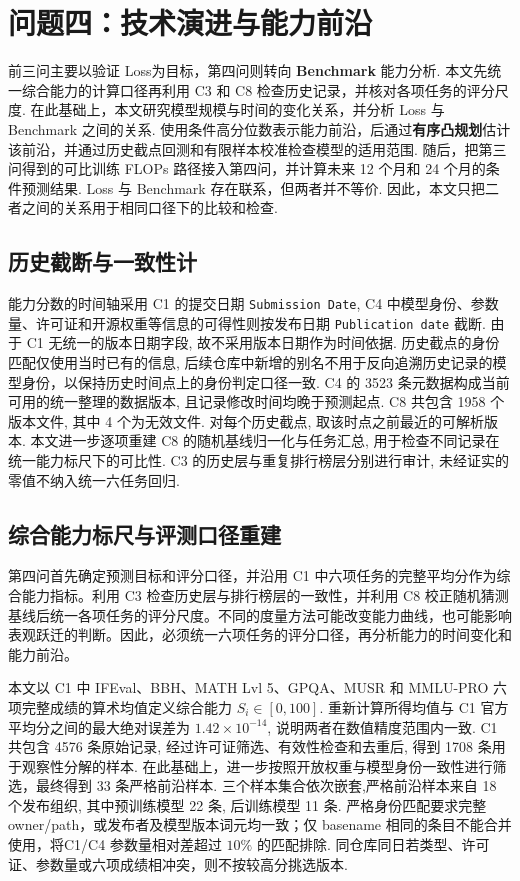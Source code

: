 \section{问题四：技术演进与能力前沿}\label{sec:q4}


前三问主要以验证 Loss为目标，第四问则转向 \textbf{Benchmark} 能力分析. 本文先统一综合能力的计算口径再利用 C3 和 C8 检查历史记录，并核对各项任务的评分尺度. 在此基础上，本文研究模型规模与时间的变化关系，并分析 Loss 与 Benchmark 之间的关系. 使用条件高分位数表示能力前沿，后通过\textbf{有序凸规划}估计该前沿，并通过历史截点回测和有限样本校准检查模型的适用范围. 随后，把第三问得到的可比训练 FLOPs 路径接入第四问，并计算未来 12 个月和 24 个月的条件预测结果. Loss 与 Benchmark 存在联系，但两者并不等价. 因此，本文只把二者之间的关系用于相同口径下的比较和检查.

\subsection{历史截断与一致性计}
能力分数的时间轴采用 C1 的提交日期 \texttt{Submission Date}, C4 中模型身份、参数量、许可证和开源权重等信息的可得性则按发布日期 \texttt{Publication date} 截断. 由于 C1 无统一的版本日期字段, 故不采用版本日期作为时间依据. 历史截点的身份匹配仅使用当时已有的信息, 后续仓库中新增的别名不用于反向追溯历史记录的模型身份，以保持历史时间点上的身份判定口径一致. C4 的 3523 条元数据构成当前可用的统一整理的数据版本, 且记录修改时间均晚于预测起点. C8 共包含 1958 个版本文件, 其中 4 个为无效文件. 对每个历史截点, 取该时点之前最近的可解析版本. 本文进一步逐项重建 C8 的随机基线归一化与任务汇总, 用于检查不同记录在统一能力标尺下的可比性. C3 的历史层与重复排行榜层分别进行审计, 未经证实的零值不纳入统一六任务回归.

\subsection{综合能力标尺与评测口径重建}

第四问首先确定预测目标和评分口径，并沿用 C1 中六项任务的完整平均分作为综合能力指标。利用 C3 检查历史层与排行榜层的一致性，并利用 C8 校正随机猜测基线后统一各项任务的评分尺度。不同的度量方法可能改变能力曲线，也可能影响表观跃迁的判断\cite{schaeffer_mirage}。因此，必须统一六项任务的评分口径，再分析能力的时间变化和能力前沿。

本文以 C1 中 IFEval、BBH、MATH Lvl 5、GPQA、MUSR 和 MMLU-PRO 六项完整成绩的算术均值定义综合能力 $S_i\in[0,100]$. 重新计算所得均值与 C1 官方平均分之间的最大绝对误差为 $1.42\times10^{-14}$, 说明两者在数值精度范围内一致. C1 共包含 4576 条原始记录, 经过许可证筛选、有效性检查和去重后, 得到 1708 条用于观察性分解的样本. 在此基础上，进一步按照开放权重与模型身份一致性进行筛选，最终得到 33 条严格前沿样本. 三个样本集合依次嵌套,严格前沿样本来自 18 个发布组织, 其中预训练模型 22 条, 后训练模型 11 条. 严格身份匹配要求完整 owner/path，或发布者及模型版本词元均一致；仅 basename 相同的条目不能合并使用，将C1/C4 参数量相对差超过 $10\%$ 的匹配排除. 同仓库同日若类型、许可证、参数量或六项成绩相冲突，则不按较高分挑选版本. 


